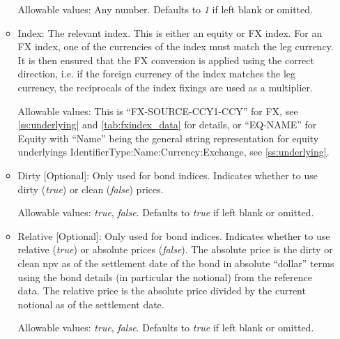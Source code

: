 \begin{itemize}
\begin{itemize}
  Allowable values: Any number. Defaults to \emph{1} if left blank or omitted.

\item Index: The relevant index. This is either an equity or FX index. For an FX index, one of the currencies of the
  index must match the leg currency. It is then ensured that the FX conversion is applied using the correct direction,
  i.e. if the foreign currency of the index matches the leg currency, the reciprocals of the index fixings are used as a
  multiplier.

  Allowable values: This is ``FX-SOURCE-CCY1-CCY'' for FX, see \ref{ss:underlying} and \ref{tab:fxindex_data} for
  details, or ``EQ-NAME'' for Equity with ``Name'' being the general string representation for equity underlyings
  {IdentifierType}:{Name}:{Currency}:{Exchange}, see \ref{ss:underlying}.





\item Dirty [Optional]: Only used for bond indices. Indicates whether to use dirty (\emph{true}) or clean
  (\emph{false}) prices.

  Allowable values: \emph{true}, \emph{false}. Defaults to \emph{true} if left blank or omitted. 

\item Relative [Optional]: Only used for bond indices. Indicates whether to use relative (\emph{true}) or
  absolute prices (\emph{false}). The absolute price is the dirty or clean npv as of the settlement date of the bond in
  absolute ``dollar'' terms using the bond details (in particular the notional) from the reference data. The relative
  price is the absolute price divided by the current notional as of the settlement date.

  Allowable values: \emph{true}, \emph{false}. Defaults to \emph{true} if left blank or omitted. 


\end{itemize}
\end{itemize}
